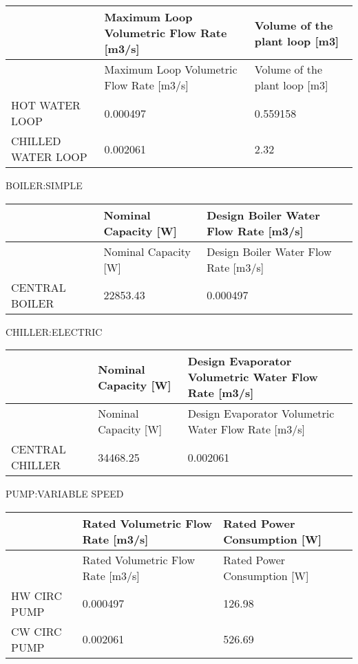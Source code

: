 \begin{longtable}[c]{>{\raggedright}p{1.5in}>{\raggedright}p{2.62in}>{\raggedright}p{1.87in}}
\toprule 
~ & Maximum Loop Volumetric Flow Rate [m3/s] & Volume of the plant loop [m3] \tabularnewline
\midrule
\endfirsthead

\toprule 
~ & Maximum Loop Volumetric Flow Rate [m3/s] & Volume of the plant loop [m3] \tabularnewline
\midrule
\endhead

HOT WATER LOOP & 0.000497 & 0.559158 \tabularnewline
CHILLED WATER LOOP & 0.002061 & 2.32 \tabularnewline
\bottomrule
\end{longtable}

BOILER:SIMPLE

\begin{longtable}[c]{>{\raggedright}p{1.5in}>{\raggedright}p{1.56in}>{\raggedright}p{2.93in}}
\toprule 
~ & Nominal Capacity [W] & Design Boiler Water Flow Rate [m3/s] \tabularnewline
\midrule
\endfirsthead

\toprule 
~ & Nominal Capacity [W] & Design Boiler Water Flow Rate [m3/s] \tabularnewline
\midrule
\endhead

CENTRAL BOILER & 22853.43 & 0.000497 \tabularnewline
\bottomrule
\end{longtable}

CHILLER:ELECTRIC

\begin{longtable}[c]{>{\raggedright}p{1.5in}>{\raggedright}p{1.5in}>{\raggedright}p{3.0in}}
\toprule 
~ & Nominal Capacity [W] & Design Evaporator Volumetric Water Flow Rate [m3/s] \tabularnewline
\midrule
\endfirsthead

\toprule 
~ & Nominal Capacity [W] & Design Evaporator Volumetric Water Flow Rate [m3/s] \tabularnewline
\midrule
\endhead

CENTRAL CHILLER & 34468.25 & 0.002061 \tabularnewline
\bottomrule
\end{longtable}

PUMP:VARIABLE SPEED

\begin{longtable}[c]{>{\raggedright}p{1.5in}>{\raggedright}p{2.5in}>{\raggedright}p{2.0in}}
\toprule 
~ & Rated Volumetric Flow Rate [m3/s] & Rated Power Consumption [W] \tabularnewline
\midrule
\endfirsthead

\toprule 
~ & Rated Volumetric Flow Rate [m3/s] & Rated Power Consumption [W] \tabularnewline
\midrule
\endhead

HW CIRC PUMP & 0.000497 & 126.98 \tabularnewline
CW CIRC PUMP & 0.002061 & 526.69 \tabularnewline
\bottomrule
\end{longtable}

